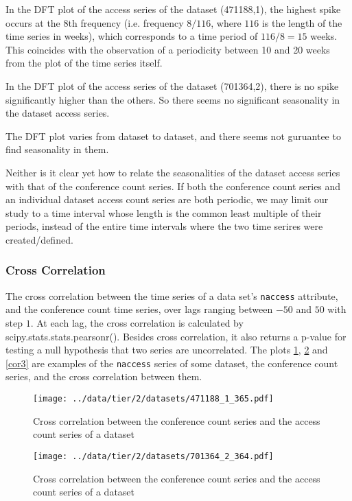 \documentclass[final, 12pt]{elsarticle}
\begin{document}
In the DFT plot of the access series of the dataset (471188,1), the highest spike occurs at the 8th frequency (i.e. frequency $8/116$, where $116$ is the length of the time series in weeks), which corresponds to a time period of $116/8 = 15$ weeks. This coincides with the observation of a periodicity between 10 and 20 weeks from the plot of the time series itself.

In the DFT plot of the access series of the dataset (701364,2), there is no spike significantly higher than the others. So there seems no significant seasonality in the dataset access series.

The DFT plot varies from dataset to dataset, and there seems not guruantee to find seasonality in them.

Neither is it clear yet how to relate the seasonalities of the dataset access series with that of the conference count series.
If both the conference count series and an individual dataset access count series are both periodic,
we may limit our study to a time interval whose length is the common least multiple of their periods, instead of the entire time intervals where the two time serires were created/defined.


\subsubsection{Cross Correlation}

The cross correlation between the time series of a data set's \verb|naccess| attribute, and the conference count time series, over lags ranging between $-50$ and $50$ with step $1$. At each lag, the cross correlation is calculated by scipy.stats.stats.pearsonr(). Besides cross correlation, it also returns a p-value for testing a null hypothesis that two series are uncorrelated. 
The plots \ref{cor1}, \ref{cor2} and \ref{cor3} are examples of the \verb|naccess| series of some dataset, the conference count series, and the cross correlation between them.

\begin{figure}
\begin{center}
\texttt{[image: ../data/tier/2/datasets/471188\_1\_365.pdf]}
\end{center}
\caption{Cross correlation between the conference count series and the access count series of a dataset}
\label{cor1}
\end{figure}

\begin{figure}
\begin{center}   
\texttt{[image: ../data/tier/2/datasets/701364\_2\_364.pdf]}
\end{center}
\caption{Cross correlation between the conference count series and the access count series of a dataset}
\label{cor2}
\end{figure}
\end{document}

